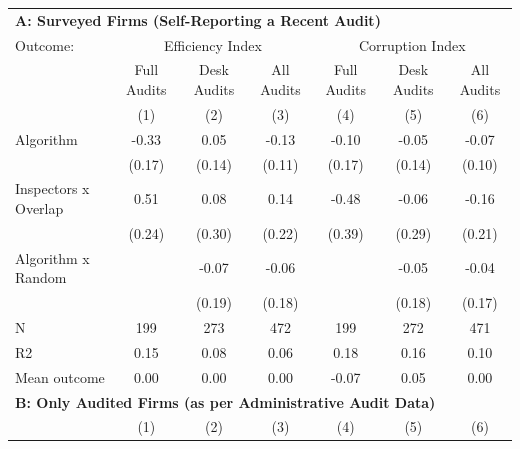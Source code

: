 \begin{tabular}{lccc|ccc} \toprule
\multicolumn{7}{l}{\textbf{A: Surveyed Firms (Self-Reporting a Recent Audit)}} \\ \multicolumn{1}{l}{Outcome:} & \multicolumn{3}{c}{Efficiency Index} & \multicolumn{3}{c}{Corruption Index} \\ \multicolumn{1}{l}{} & Full Audits & Desk Audits & All Audits & Full Audits & Desk Audits & All Audits \\ \multicolumn{1}{l}{} & (1) & (2) & (3) & (4) & (5) & (6) \\ \midrule
Algorithm   &       -0.33\sym{*}  &        0.05         &       -0.13         &       -0.10         &       -0.05         &       -0.07         \\
            &      (0.17)         &      (0.14)         &      (0.11)         &      (0.17)         &      (0.14)         &      (0.10)         \\
\addlinespace
Inspectors x Overlap&        0.51\sym{**} &        0.08         &        0.14         &       -0.48         &       -0.06         &       -0.16         \\
            &      (0.24)         &      (0.30)         &      (0.22)         &      (0.39)         &      (0.29)         &      (0.21)         \\
\addlinespace
Algorithm x Random&                     &       -0.07         &       -0.06         &                     &       -0.05         &       -0.04         \\
            &                     &      (0.19)         &      (0.18)         &                     &      (0.18)         &      (0.17)         \\
\midrule
N           &         199         &         273         &         472         &         199         &         272         &         471         \\
R2          &        0.15         &        0.08         &        0.06         &        0.18         &        0.16         &        0.10         \\
Mean outcome&        0.00         &        0.00         &        0.00         &       -0.07         &        0.05         &        0.00         \\

\midrule \multicolumn{7}{l}{\textbf{B: Only Audited Firms (as per Administrative Audit Data)}} \\ \multicolumn{1}{l}{} & (1) & (2) & (3) & (4) & (5) & (6) \\ \midrule


\end{tabular}
